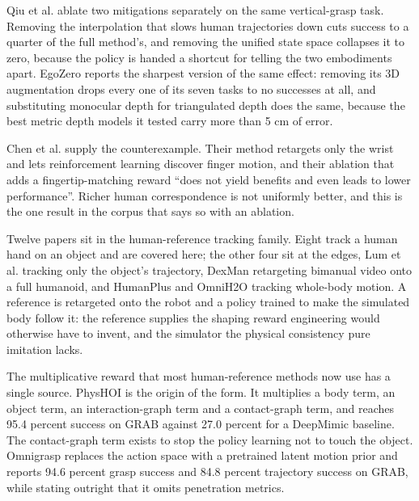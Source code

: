 Qiu et al. \cite{humanoid_policy_human_policy_2025} ablate two mitigations separately on the
same vertical-grasp task. Removing the interpolation that slows human trajectories down cuts
success to a quarter of the full method's, and removing the unified state space collapses it to
zero, because the policy is handed a shortcut for telling the two embodiments apart. EgoZero
\cite{egozero_2025} reports the sharpest version of the same effect: removing its 3D augmentation
drops every one of its seven tasks to no successes at all, and substituting monocular depth for
triangulated depth does the same, because the best metric depth models it tested carry more than 5
cm of error.

Chen et al. \cite{objdex_2024} supply the counterexample. Their method retargets only the wrist
and lets reinforcement learning discover finger motion, and their ablation that adds a
fingertip-matching reward ``does not yield benefits and even leads to lower performance''. Richer
human correspondence is not uniformly better, and this is the one result in the corpus that says
so with an ablation.

\label{sec:train:track}
Twelve papers sit in the human-reference tracking family. Eight track a human hand on an
object and are covered here; the other four sit at the edges, Lum et al.
\cite{human2sim2robot_2025} tracking only the object's trajectory, DexMan \cite{dexman_2025}
retargeting bimanual video onto a full humanoid, and HumanPlus \cite{humanplus_2024} and OmniH2O
\cite{omnih2o_2024} tracking whole-body motion. A reference is retargeted onto the robot and a
policy trained to make the simulated body follow it: the reference supplies the shaping reward
engineering would otherwise have to invent, and the simulator the physical consistency pure
imitation lacks.

The multiplicative reward that most human-reference methods now use has a single source.
PhysHOI \cite{physhoi_2023} is the origin of the form. It multiplies a body term, an object
term, an interaction-graph term and a contact-graph term, and reaches 95.4 percent success on
GRAB against 27.0 percent for a DeepMimic baseline. The contact-graph term exists to stop the
policy learning not to touch the object. Omnigrasp \cite{omnigrasp_2024} replaces the action
space with a pretrained latent motion prior and reports 94.6 percent grasp success and 84.8
percent trajectory success on GRAB, while stating outright that it omits penetration metrics.

